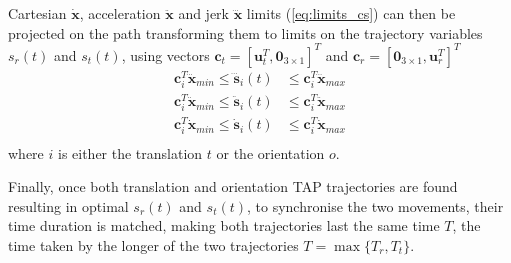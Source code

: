 Cartesian $\dot{\bm{x}}$, acceleration $\ddot{\bm{x}}$ and jerk $\dddot{\bm{x}}$ limits (\ref{eq:limits_cs}) can then be projected on the path transforming them to limits on the trajectory variables $s_r(t)$ and $s_t(t)$, using vectors $\bm{c}_t = [\bm{u}_t^T, \bm{0}_{3\times 1}]^T$ and $\bm{c}_r =[\bm{0}_{3\times 1}, \bm{u}_r^T]^T$
\begin{equation}
\begin{split}
\bm{c}^T_i\dddot{\bm{x}}_{min} \leq \dddot{\bm{s}}_i(t)&  \leq  \bm{c}^T_i\dddot{\bm{x}}_{max} \\
\bm{c}^T_i\ddot{\bm{x}}_{min} \leq \ddot{\bm{s}}_i(t)&  \leq \bm{c}^T_i\ddot{\bm{x}}_{max} \\
\bm{c}^T_i\dot{\bm{x}}_{min} \leq \dot{\bm{s}}_i(t)&  \leq \bm{c}^T_i\dot{\bm{x}}_{max}\\
 \end{split} \label{eq:limits_s_cs}
\end{equation}
where $i$ is either the translation $t$ or the orientation $o$.


Finally, once both translation and orientation TAP trajectories are found resulting in optimal $s_r(t)$ and $s_t(t)$, to synchronise the two movements, their time duration is matched, making both trajectories last the same time $T$, the time taken by the longer of the two trajectories $T = \max\{T_r,T_t\}$. 

